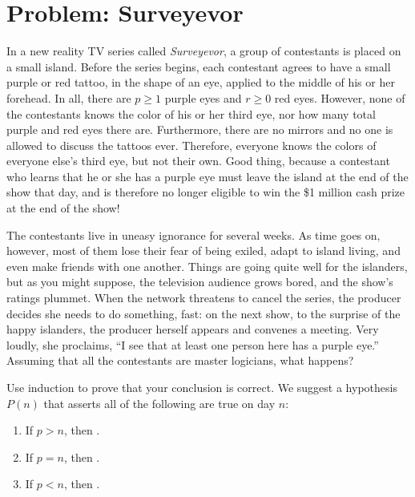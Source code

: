\documentclass[12pt]{article}
\begin{document}


\newpage

\section{Problem: Surveyevor}

In a new reality TV series called {\em Surveyevor}, a group of
contestants is placed on a small island. Before the series begins,
each contestant agrees to have a small purple or red tattoo, in the
shape of an eye, applied to the middle of his or her forehead. In all,
there are $p \geq 1$ purple eyes and $r \geq 0$ red eyes.  However,
none of the contestants knows the color of his or her third eye, nor
how many total purple and red eyes there are. Furthermore, there are
no mirrors and no one is allowed to discuss the tattoos ever.
Therefore, everyone knows the colors of everyone else's third eye, but
not their own. Good thing, because a contestant who learns that he or
she has a purple eye must leave the island at the end of the show that
day, and is therefore no longer eligible to win the \$1 million cash
prize at the end of the show!

The contestants live in uneasy ignorance for several weeks. As time
goes on, however, most of them lose their fear of being exiled, adapt
to island living, and even make friends with one another. Things are
going quite well for the islanders, but as you might suppose, the
television audience grows bored, and the show's ratings plummet. When
the network threatens to cancel the series, the producer decides she
needs to do something, fast: on the next show, to the surprise of the
happy islanders, the producer herself appears and convenes a
meeting. Very loudly, she proclaims, ``I see that at least one person
here has a purple eye.''  Assuming that all the contestants are master
logicians, what happens?


\noindent Use induction to prove that your conclusion is correct.  We
suggest a hypothesis $P(n)$ that asserts all of the following are true
on day $n$:

\begin{enumerate}
\item If $p > n$, then \underline{\hspace{5in}}.
\item If $p = n$, then \underline{\hspace{5in}}.
\item If $p < n$, then \underline{\hspace{5in}}.
\end{enumerate}
\end{document}
